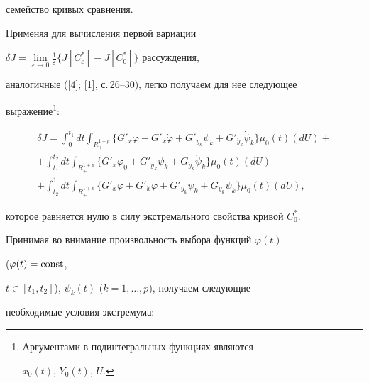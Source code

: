 семейство кривых сравнения. 


 


Применяя для вычисления первой вариации 


$\delta J=\lim\limits_{\varepsilon\to0}\frac{1}{\varepsilon} 


\{J[C^*_\varepsilon]-J[C^*_0]\}$ рассуждения, 


аналогичные ([4]; [1], с.\,26--30), легко получаем для нее следующее 


выражение\footnote{Аргументами в подинтегральных функциях являются 


$x_0(t)$, $Y_0(t)$, $U$.}: 


\begin{multline*} 


\delta J=\int^{t_1}_0 dt\int_{R^{1+p}_+} 


\{G'_x\varphi+G'_{\Dot x}\Dot\varphi+G'_{y_k} 


\psi_k+G'_{\Dot y_k} 


\Dot\psi_k\}\mu_0(t)(d U)+\\ 


% 


+\int^{t_2}_{t_1}dt\int_{R^{1+p}_+} 


\{G'_x\varphi_0+G'_{y_k}\psi_k+G_{\Dot y_k} 


\Dot\psi_k\}\mu_0(t)(d U)+\\ 


% 


+\int^1_{t_2}dt\int_{R^{1+p}_+} 


\{G'_x\varphi+G'_{\Dot x}\Dot\varphi+ 


G'_{y_k}\psi_k+G_{\Dot y_k}\Dot\psi_k\} 


\mu_0(t)(d U), 


\end{multline*} 


которое равняется нулю в силу экстремального свойства кривой $C^*_0$. 


 


Принимая во внимание произвольность выбора функций $\varphi(t)$ 


($\varphi(t)=\operatorname{const}$, 


$t\in[t_1,t_2]$), $\psi_k(t)$ ($k=1,\dotsc,p$), получаем следующие 


необходимые условия экстремума: 


